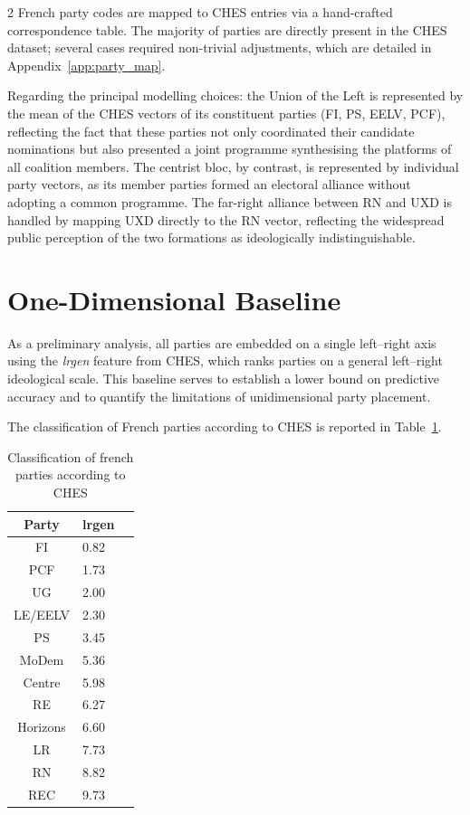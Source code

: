 \documentclass[10pt, a4paper]{article}
\begin{document}
\begin{multicols}{2}
French party codes are mapped to CHES entries via a hand-crafted
correspondence table. The majority of parties are directly present in the
CHES dataset; several cases required non-trivial adjustments, which are
detailed in Appendix~\ref{app:party_map}.

Regarding the principal modelling choices: the Union of the Left is represented
by the mean of the CHES vectors of its constituent parties (FI, PS, EELV, PCF),
reflecting the fact that these parties not only coordinated their candidate
nominations but also presented a joint programme synthesising the platforms of
all coalition members. The centrist bloc, by contrast, is represented by
individual party vectors, as its member parties formed an electoral alliance
without adopting a common programme. The far-right alliance between RN and UXD
is handled by mapping UXD directly to the RN vector, reflecting the widespread
public perception of the two formations as ideologically indistinguishable.

\section{One-Dimensional Baseline}
\label{sec:baseline}

As a preliminary analysis, all parties are embedded on a single left--right
axis using the \emph{lrgen} feature from CHES, which ranks parties on a
general left--right ideological scale. This baseline serves to establish a
lower bound on predictive accuracy and to quantify the limitations of
unidimensional party placement.

The classification of French parties according to CHES is reported in
Table~\ref{tab:lrgen-classification}.

\begin{table}[H]
\centering
\caption{Classification of french parties according to CHES}
\label{tab:lrgen-classification}
\scriptsize
\begin{tabular}{clc}
\toprule
Party & lrgen \\
\midrule
FI        & 0.82 \\
PCF       & 1.73 \\
UG        & 2.00 \\
LE/EELV   & 2.30 \\
PS        & 3.45 \\
MoDem     & 5.36 \\
Centre    & 5.98 \\
RE        & 6.27 \\
Horizons  & 6.60 \\
LR        & 7.73 \\
RN        & 8.82 \\
REC       & 9.73 \\
\bottomrule
\end{tabular}
\end{table}


\end{multicols}
\end{document}
